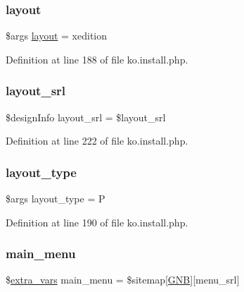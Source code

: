 \subsubsection{\texorpdfstring{layout}{layout}}
{\footnotesize\ttfamily \$args \hyperlink{classlayout}{layout} = \textquotesingle{}xedition\textquotesingle{}}



Definition at line 188 of file ko.\+install.\+php.

\mbox{\label{ko_8install_8php_a70054876db09b2519a1726663c8dd9e7}} 
\subsubsection{\texorpdfstring{layout\+\_\+srl}{layout\_srl}}
{\footnotesize\ttfamily \$design\+Info layout\+\_\+srl = \$layout\+\_\+srl}



Definition at line 222 of file ko.\+install.\+php.

\mbox{\label{ko_8install_8php_a0532d89570cfdaebc628afac2ff5a81b}} 
\subsubsection{\texorpdfstring{layout\+\_\+type}{layout\_type}}
{\footnotesize\ttfamily \$args layout\+\_\+type = \textquotesingle{}P\textquotesingle{}}



Definition at line 190 of file ko.\+install.\+php.

\mbox{\label{ko_8install_8php_ac71104c770b8ced3891f35849d3f2906}} 
\subsubsection{\texorpdfstring{main\+\_\+menu}{main\_menu}}
{\footnotesize\ttfamily \$\hyperlink{ko_8install_8php_ae1dcb37fc34a8f312d2e6abd6f806743}{extra\+\_\+vars} main\+\_\+menu = \$sitemap\mbox{[}\textquotesingle{}\hyperlink{ko_8install_8php_a9b1716b68fc04f3492448f38148dcbf5}{G\+NB}\textquotesingle{}\mbox{]}\mbox{[}\textquotesingle{}menu\+\_\+srl\textquotesingle{}\mbox{]}}



